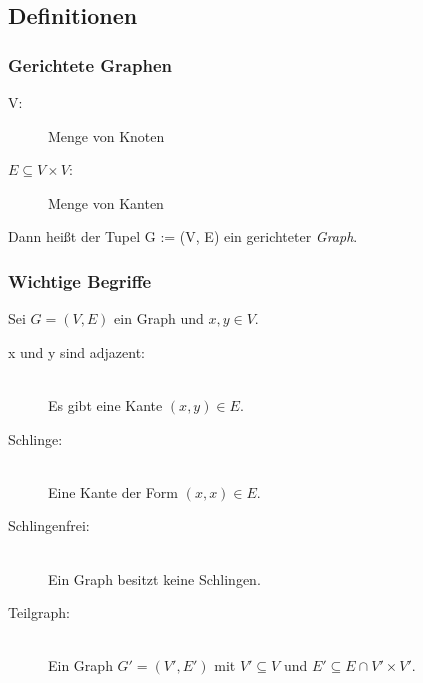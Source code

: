 \subsection{Definitionen}
\begin{frame}
  \frametitle{Gerichtete Graphen}
  \begin{definition}
    \begin{description}
      \item[V:] Menge von Knoten
      \item[$E \subseteq V \times V$:] Menge von Kanten
    \end{description}
    Dann heißt der Tupel G := (V, E) ein gerichteter \emph{Graph}.
  \end{definition}
\end{frame}
\begin{frame}
	\frametitle{Wichtige Begriffe}
	\begin{definition}
    Sei $G = (V, E)$ ein Graph und $x, y \in V$.
		\begin{description}
			\item[x und y sind adjazent:] \hfill \\
        Es gibt eine Kante $(x,y)\in E$.\pause
			\item[Schlinge:] \hfill \\
        Eine Kante der Form $(x,x)\in E$.\pause
			\item[Schlingenfrei:] \hfill \\
        Ein Graph besitzt keine Schlingen.\pause
			\item[Teilgraph:] \hfill \\
        Ein Graph $G'=(V',E')$ mit $V'\subseteq V$ und $E'\subseteq E \cap V'\times V'$.
		\end{description}
	\end{definition}
\end{frame}
